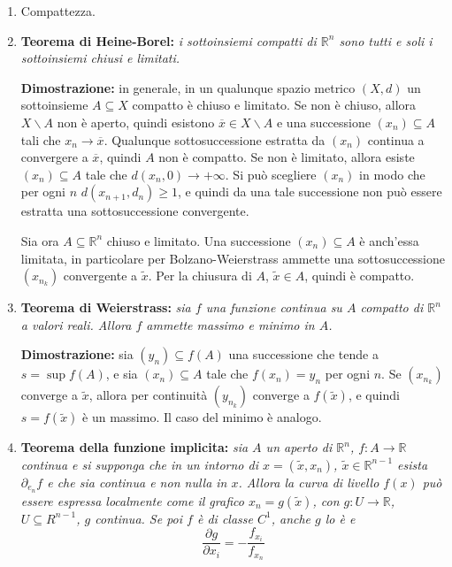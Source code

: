 \documentclass[a4paper,11pt]{article}
\begin{document}
\begin{enumerate}
	\item Compattezza.
	\item \textbf{Teorema di Heine-Borel:} \textit{i sottoinsiemi compatti di $\mathbb{R}^n$ sono tutti e soli i sottoinsiemi chiusi e limitati.}
	
	\textbf{Dimostrazione:} in generale, in un qualunque spazio metrico $(X,d)$ un sottoinsieme $A\subseteq X$ compatto è chiuso e limitato. Se non è chiuso, allora $X\backslash A$ non è aperto, quindi esistono $\overline{x}\in X\backslash A$ e una successione $(x_n)\subseteq A$ tali che $x_n\to\overline{x}$. Qualunque sottosuccessione estratta da $(x_n)$ continua a convergere a $\overline{x}$, quindi $A$ non è compatto. Se non è limitato, allora esiste $(x_n)\subseteq A$ tale che $d(x_n,0)\to+\infty$. Si può scegliere $(x_n)$ in modo che per ogni $n$ $d(x_{n+1},d_n)\geq1$, e quindi da una tale successione non può essere estratta una sottosuccessione convergente.
	
	Sia ora $A\subseteq\mathbb{R}^n$ chiuso e limitato. Una successione $(x_n)\subseteq A$ è anch'essa limitata, in particolare per Bolzano-Weierstrass ammette una sottosuccessione $(x_{n_k})$ convergente a $\tilde{x}$. Per la chiusura di $A$, $\tilde{x}\in A$, quindi è compatto.
	
	\item \textbf{Teorema di Weierstrass:} \textit{sia $f$ una funzione continua su $A$ compatto di $\mathbb{R}^n$ a valori reali. Allora $f$ ammette massimo e minimo in $A$.}
	
	\textbf{Dimostrazione:} sia $(y_n)\subseteq f(A)$ una successione che tende a $s=\sup f(A)$, e sia $(x_n)\subseteq A$ tale che $f(x_n)=y_n$ per ogni $n$. Se $(x_{n_k})$ converge a $\tilde{x}$, allora per continuità $(y_{n_k})$ converge a $f(\tilde{x})$, e quindi $s=f(\tilde{x})$ è un massimo. Il caso del minimo è analogo.
	
	\item \textbf{Teorema della funzione implicita:} \textit{sia $A$ un aperto di $\mathbb{R}^n$, $f\colon A\to\mathbb{R}$ continua e si supponga che in un intorno di $x=(\tilde{x},x_n)$, $\tilde{x}\in\mathbb{R}^{n-1}$ esista $\partial_{e_n}f$ e che sia continua e non nulla in $x$. Allora la curva di livello $f(x)$ può essere espressa localmente come il grafico $x_n=g(\tilde{x})$, con $g\colon U\to\mathbb{R}$, $U\subseteq R^{n-1}$, $g$ continua. Se poi $f$ è di classe $C^1$, anche $g$ lo è e}
		\[\frac{\partial g}{\partial x_i}=-\frac{f_{x_i}}{f_{x_n}}\]
		

\end{enumerate}
\end{document}
